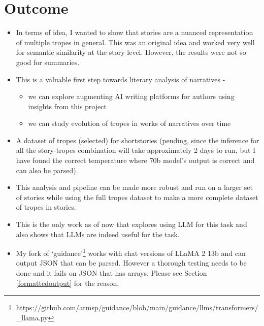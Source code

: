 \documentclass[11pt]{article}
\begin{document}
\section{Outcome}
\begin{itemize}
  \item In terms of idea, I wanted to show that stories are a nuanced representation of multiple tropes in general. This was an original idea and worked very well for semantic similarity at the story level. However, the results were not so good for summaries.
  \item This is a valuable first step towards literary analysis of narratives -
  \begin{itemize}
    \item we can explore augmenting AI writing platforms for authors using insights from this project
    \item we can study evolution of tropes in works of narratives over time
  \end{itemize}
  \item A dataset of tropes (selected) for shortstories (pending, since the inference for all the story-tropes combination will take approximately 2 days to run, but I have found the correct temperature where 70b model's output is correct and can also be parsed). 
  \item This analysis and pipeline can be made more robust and run on a larger set of stories while using the full tropes dataset to make a more complete dataset of tropes in stories.
  \item This is the only work as of now that explores using LLM for this task and also shows that LLMs are indeed useful for the task. 
  \item My fork of `guidance'\footnote[2]{https://github.com/armsp/guidance/blob/main/guidance/llms/transformers/\_llama.py}\label{fork} works with chat versions of LLaMA 2 13b and can output JSON that can be parsed. However a thorough testing needs to be done and it fails on JSON that has arrays. Please see Section \ref{formattedoutput} for the reason.

\end{itemize}
\end{document}
